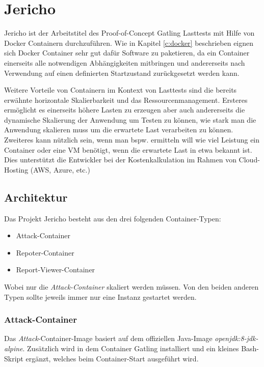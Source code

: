 \chapter{Jericho}

Jericho ist der Arbeitstitel des Proof-of-Concept Gatling Lasttests mit Hilfe von Docker Containern durchzuführen.
Wie in Kapitel \ref{c:docker} beschrieben eignen sich Docker Container sehr gut dafür Software zu paketieren, da ein Container einerseits alle notwendigen Abhängigkeiten mitbringen und andererseits nach Verwendung auf einen definierten Startzustand zurückgesetzt werden kann.

Weitere Vorteile von Containern im Kontext von Lasttests sind die bereits erwähnte horizontale Skalierbarkeit und das Ressourcenmanagement.
Ersteres ermöglicht es einerseits höhere Lasten zu erzeugen aber auch andererseits die dynamische Skalierung der Anwendung um Testen zu können, wie stark man die Anwendung skalieren muss um die erwartete Last verarbeiten zu können.
Zweiteres kann nützlich sein, wenn man bspw. ermitteln will wie viel Leistung ein Container oder eine \ac{VM} benötigt, wenn die erwartete Last in etwa bekannt ist.
Dies unterstützt die Entwickler bei der Kostenkalkulation im Rahmen von Cloud-Hosting (AWS, Azure, etc.)

\section{Architektur}

Das Projekt Jericho besteht aus den drei folgenden Container-Typen:

\begin{itemize}
	\item Attack-Container
	\item Repoter-Container
	\item Report-Viewer-Container
\end{itemize}

Wobei nur die \textit{Attack-Container} skaliert werden müssen.
Von den beiden anderen Typen sollte jeweils immer nur eine Instanz gestartet werden.

\subsection{Attack-Container}

Das \textit{Attack}-Container-Image basiert auf dem offiziellen Java-Image \textit{openjdk:8-jdk-alpine}.
Zusätzlich wird in dem Container Gatling installiert und ein kleines Bash-Skript ergänzt, welches beim Container-Start ausgeführt wird.

